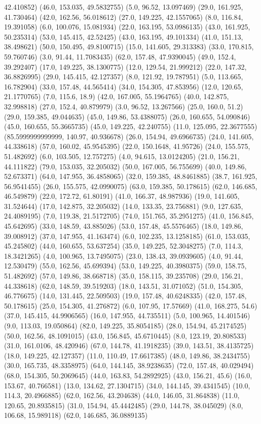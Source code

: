 {42.410852) (46.0, 153.035, 49.5832755) (5.0, 96.52, 13.097469) (29.0, 161.925, 41.730464) (42.0, 162.56, 56.018612) (27.0, 149.225, 42.1557065) (8.0, 116.84, 19.391058) (6.0, 100.076, 15.081934) (22.0, 163.195, 53.0986135) (43.0, 161.925, 50.235314) (53.0, 145.415, 42.52425) (43.0, 163.195, 49.101334) (41.0, 151.13, 38.498621) (50.0, 150.495, 49.8100715) (15.0, 141.605, 29.313383) (33.0, 170.815, 59.760746) (3.0, 91.44, 11.7083435) (62.0, 157.48, 47.9390045) (49.0, 152.4, 39.292407) (17.0, 149.225, 38.1300775) (12.0, 129.54, 21.999212) (22.0, 147.32, 36.8826995) (29.0, 145.415, 42.127357) (8.0, 121.92, 19.787951) (5.0, 113.665, 16.782904) (33.0, 157.48, 44.565414) (34.0, 154.305, 47.853956) (12.0, 120.65, 21.1770765) (7.0, 115.6, 18.9) (42.0, 167.005, 55.1964765) (40.0, 142.875, 32.998818) (27.0, 152.4, 40.879979) (3.0, 96.52, 13.267566) (25.0, 160.0, 51.2) (29.0, 159.385, 49.044635) (45.0, 149.86, 53.4388075) (26.0, 160.655, 54.090846) (45.0, 160.655, 55.3665735) (45.0, 149.225, 42.240755) (11.0, 125.095, 22.3677555) (85.5999999999999, 140.97, 40.936678) (26.0, 154.94, 49.6966735) (24.0, 141.605, 44.338618) (57.0, 160.02, 45.9545395) (22.0, 150.1648, 41.95726) (24.0, 155.575, 51.482692) (6.0, 103.505, 12.757275) (4.0, 94.615, 13.0124205) (21.0, 156.21, 44.111822) (79.0, 153.035, 32.205032) (50.0, 167.005, 56.755699) (40.0, 149.86, 52.673371) (64.0, 147.955, 36.4858065) (32.0, 159.385, 48.8461885) (38.7, 161.925, 56.9541455) (26.0, 155.575, 42.0990075) (63.0, 159.385, 50.178615) (62.0, 146.685, 46.549879) (22.0, 172.72, 61.80191) (41.0, 166.37, 48.987936) (19.0, 141.605, 31.524644) (17.0, 142.875, 32.205032) (14.0, 133.35, 23.756881) (9.0, 127.635, 24.4089195) (7.0, 119.38, 21.5172705) (74.0, 151.765, 35.2951275) (41.0, 156.845, 45.642695) (33.0, 148.59, 43.885026) (53.0, 157.48, 45.5576465) (18.0, 149.86, 39.008912) (37.0, 147.955, 41.163474) (6.0, 102.235, 13.1258185) (61.0, 153.035, 45.245802) (44.0, 160.655, 53.637254) (35.0, 149.225, 52.3048275) (7.0, 114.3, 18.3421265) (4.0, 100.965, 13.7495075) (23.0, 138.43, 39.0939605) (4.0, 91.44, 12.530479) (55.0, 162.56, 45.699394) (53.0, 149.225, 40.3980375) (59.0, 158.75, 51.482692) (57.0, 149.86, 38.668718) (35.0, 158.115, 39.235708) (29.0, 156.21, 44.338618) (62.0, 148.59, 39.519203) (18.0, 143.51, 31.071052) (51.0, 154.305, 46.776675) (14.0, 131.445, 22.509503) (19.0, 157.48, 40.6248335) (42.0, 157.48, 50.178615) (25.0, 154.305, 41.276872) (6.0, 107.95, 17.57669) (41.0, 168.275, 54.6) (37.0, 145.415, 44.9906565) (16.0, 147.955, 44.735511) (5.0, 100.965, 14.401546) (9.0, 113.03, 19.050864) (82.0, 149.225, 35.8054185) (28.0, 154.94, 45.2174525) (50.0, 162.56, 48.1091015) (43.0, 156.845, 45.6710445) (8.0, 123.19, 20.808533) (31.0, 161.0106, 48.420946) (67.0, 144.78, 41.1918235) (39.0, 143.51, 38.4135725) (18.0, 149.225, 42.127357) (11.0, 110.49, 17.6617385) (48.0, 149.86, 38.2434755) (30.0, 165.735, 48.3358975) (64.0, 144.145, 38.9238635) (72.0, 157.48, 40.029494) (68.0, 154.305, 50.2069645) (44.0, 163.83, 54.2892925) (43.0, 156.21, 45.6) (16.0, 153.67, 40.766581) (13.0, 134.62, 27.1304715) (34.0, 144.145, 39.4341545) (10.0, 114.3, 20.4966885) (62.0, 162.56, 43.204638) (44.0, 146.05, 31.864838) (11.0, 120.65, 20.8935815) (31.0, 154.94, 45.4442485) (29.0, 144.78, 38.045029) (8.0, 106.68, 15.989118) (62.0, 146.685, 36.0889135) }
